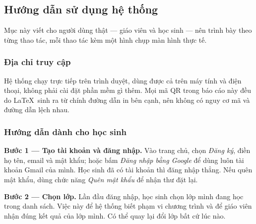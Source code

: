 \subsection{Hướng dẫn sử dụng hệ thống}

Mục này viết cho người dùng thật --- giáo viên và học sinh --- nên trình bày
theo từng thao tác, mỗi thao tác kèm một hình chụp màn hình thực tế.

\subsubsection{Địa chỉ truy cập}

\begin{center}
\setlength{\fboxsep}{10pt}
\end{center}

Hệ thống chạy trực tiếp trên trình duyệt, dùng được cả trên máy tính và điện
thoại, không phải cài đặt phần mềm gì thêm. Mọi mã QR trong báo cáo này đều do
\LaTeX\ sinh ra từ chính đường dẫn in bên cạnh, nên không có nguy cơ mã và
đường dẫn lệch nhau.

\subsubsection{Hướng dẫn dành cho học sinh}

\textbf{Bước 1 --- Tạo tài khoản và đăng nhập.} Vào trang chủ, chọn
\textit{Đăng ký}, điền họ tên, email và mật khẩu; hoặc bấm \textit{Đăng nhập
bằng Google} để dùng luôn tài khoản Gmail của mình. Học sinh đã có tài khoản
thì đăng nhập thẳng. Nếu quên mật khẩu, dùng chức năng \textit{Quên mật khẩu}
để nhận thư đặt lại.


\textbf{Bước 2 --- Chọn lớp.} Lần đầu đăng nhập, học sinh chọn lớp mình đang
học trong danh sách. Việc này để hệ thống biết phạm vi chương trình và để giáo
viên nhận đúng kết quả của lớp mình. Có thể quay lại đổi lớp bất cứ lúc nào.

